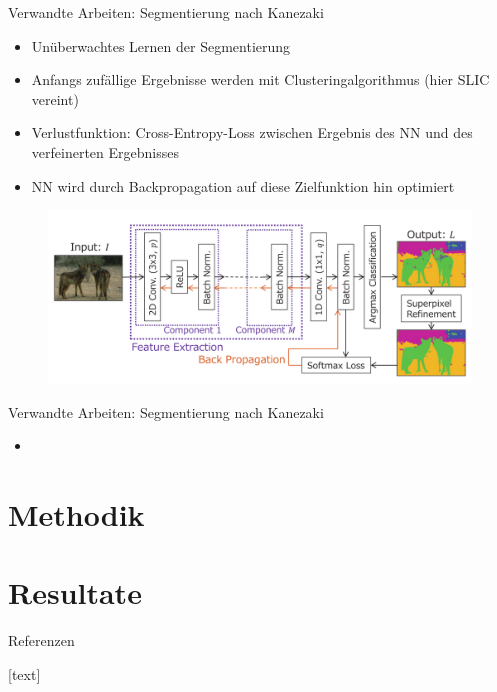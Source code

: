 \documentclass{beamer}
\begin{document}
\begin{frame}{Verwandte Arbeiten: Segmentierung nach Kanezaki \cite{kanezaki_18}}
\begin{itemize}
	\item Unüberwachtes Lernen der Segmentierung
	\item Anfangs zufällige Ergebnisse werden mit Clusteringalgorithmus (hier SLIC \cite{achanta_10} vereint)
	\item Verlustfunktion: Cross-Entropy-Loss zwischen Ergebnis des NN und des verfeinerten Ergebnisses
	\item NN wird durch Backpropagation auf diese Zielfunktion hin optimiert
\end{itemize}
\begin{figure}
	\includegraphics[height=20ex,keepaspectratio]{gfx/Kan18_01.png}
\end{figure}
\end{frame}

\begin{frame}{Verwandte Arbeiten: Segmentierung nach Kanezaki \cite{kanezaki_18}}
\begin{itemize}
	\item
\end{itemize}
\end{frame}

\section{Methodik}

\section{Resultate}



\begin{frame}[allowframebreaks]{Referenzen}
	
	[text]
	
\end{frame}
\end{document}
